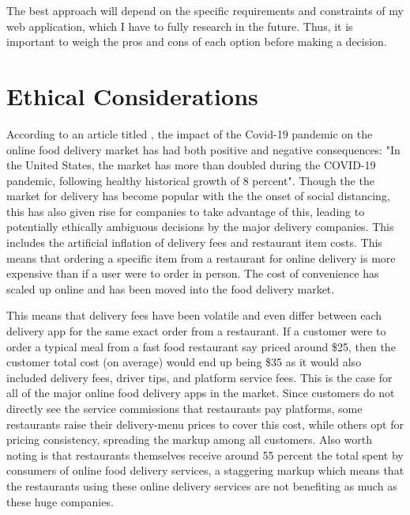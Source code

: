 \documentclass[10pt,twocolumn]{article}
\begin{document}
The best approach will depend on the specific requirements and constraints of my web application, which I have to fully research in the future. Thus, it is important to weigh the pros and cons of each option before making a decision.

\section{Ethical Considerations}

According to an article titled , the impact of the Covid-19 pandemic on the online food delivery market has had both positive and negative consequences: "In the United States, the market has more than doubled during the COVID-19 pandemic, following healthy historical growth of 8 percent". Though the the market for delivery has become popular with the the onset of social distancing, this has also given rise for companies to take advantage of this, leading to potentially ethically ambiguous decisions by the major delivery companies. This includes the artificial inflation of delivery fees and restaurant item costs. This means that ordering a specific item from a restaurant for online delivery is more expensive than if a user were to order in person. The cost of convenience has scaled up online and has been moved into the food delivery market.

This means that delivery fees have been volatile and even differ between each delivery app for the same exact order from a restaurant. If a customer were to order a typical meal from a fast food restaurant say priced around \$25, then the customer total cost (on average) would end up being \$35 as it would also included delivery fees, driver tips, and platform service fees. This is the case for all of the major online food delivery apps in the market. Since customers do not directly see the service commissions that restaurants pay platforms, some restaurants raise their delivery-menu prices to cover this cost, while others opt for pricing consistency, spreading the markup among all customers. Also worth noting is that restaurants themselves receive around 55 percent the total spent by consumers of online food delivery services, a staggering markup which means that the restaurants using these online delivery services are not benefiting as much as these huge companies.
\end{document}
